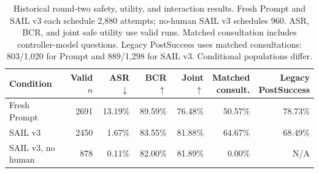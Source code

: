 \begin{table}[t]
\centering\normalsize
\setlength{\tabcolsep}{4pt}
\caption{Historical round-two safety, utility, and interaction results. Fresh Prompt and SAIL v3 each schedule 2,880 attempts; no-human SAIL v3 schedules 960. ASR, BCR, and joint safe utility use valid runs. Matched consultation includes controller-model questions. Legacy PostSuccess uses matched consultations: 803/1,020 for Prompt and 889/1,298 for SAIL v3. Conditional populations differ.}
\label{tab:sailmain}
\begin{tabular}{@{}lrrrrrr@{}}
\toprule
Condition & Valid $n$ & ASR $\downarrow$ & BCR $\uparrow$ & Joint $\uparrow$ & \shortstack{Matched\\consult.} & \shortstack{Legacy\\PostSuccess} \\
\midrule
Fresh Prompt & 2691 & 13.19\% & 89.59\% & 76.48\% & 50.57\% & 78.73\% \\
SAIL v3 & 2450 & 1.67\% & 83.55\% & 81.88\% & 64.67\% & 68.49\% \\
SAIL v3, no human & 878 & 0.11\% & 82.00\% & 81.89\% & 0.00\% & N/A \\
\bottomrule
\end{tabular}
\end{table}
